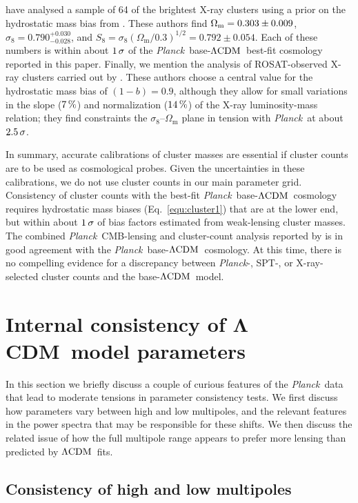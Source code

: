 \documentclass[longauth,traditabstract]{aa}
\def\Planck{\textit{Planck}}
\def\,{\thinspace}
\newcommand{\lcdm}{\texorpdfstring{{$\rm{\Lambda CDM}$}}{ΛCDM}}
\newcommand{\boldlcdm}{\texorpdfstring{$\boldsymbol{\Lambda}$CDM}{ΛCDM}}
\providecommand{\Omm}{\Omega_{\mathrm{m}}}
\providecommand{\LCDM}{{$\rm{\Lambda CDM}$}}
\newcommand{\planck}{\Planck}
\begin{document}
\citet{Schellenberger:2017usb} have analysed a sample of 64 of the brightest X-ray clusters using a prior on the
hydrostatic mass bias from \cite{Biffi:2016}. These authors find $\Omega_{\rm m} = 0.303 \pm 0.009$, $\sigma_8 = 0.790^{+0.030}_{-0.028}$, and $S_8 = \sigma_8 (\Omm/0.3)^{1/2} = 0.792 \pm 0.054$. Each of these numbers is within about $1\,\sigma$ of the
\Planck\ base-\LCDM\ best-fit cosmology reported in this paper.
 Finally, we mention the analysis of ROSAT-observed X-ray clusters carried out by \citet{Bohringer:2014ooa,
Boehringer:2017wvr}. These authors choose a central value for the hydrostatic mass bias of $(1-b) = 0.9$, although they allow
for small variations in the slope ($7\,\%$) and normalization ($14\,\%$) of the X-ray luminosity-mass relation; they find constraints the $\sigma_8$--$\Omm$ plane in tension with \Planck\ at about $2.5\,\sigma$.

In summary, accurate calibrations of cluster masses are essential if
cluster counts are to be used as cosmological probes. Given the uncertainties in these
calibrations, we do not use cluster counts in our main parameter grid. Consistency of
cluster counts with the best-fit \Planck\ base-\LCDM\ cosmology
requires hydrostatic mass biases (Eq.~\ref{equ:cluster1}) that are at
the lower end, but within about $1\,\sigma$ of bias factors estimated from
weak-lensing cluster masses. The combined \Planck\ CMB-lensing and
cluster-count analysis reported by \cite{Zubeldia:2019brr} is in
good agreement with the \Planck\ base-\LCDM\ cosmology. At this time, there is no
compelling evidence for a discrepancy between \Planck-, SPT-, or X-ray-selected cluster
counts and the base-\LCDM\ model.

\section{Internal consistency of \boldlcdm\ model parameters}\label{sec:internalconsistency}

In this section we briefly discuss a couple of curious features of the \planck\ data that lead to moderate tensions in parameter consistency tests.
We first discuss how parameters vary between high and low multipoles, and the relevant features in the power spectra that may be responsible for these shifts.
We then discuss the related issue of how the full multipole range appears to prefer more lensing than predicted by \lcdm\ fits.

\subsection{Consistency of high and low multipoles}\label{sec:highlow}
\end{document}
